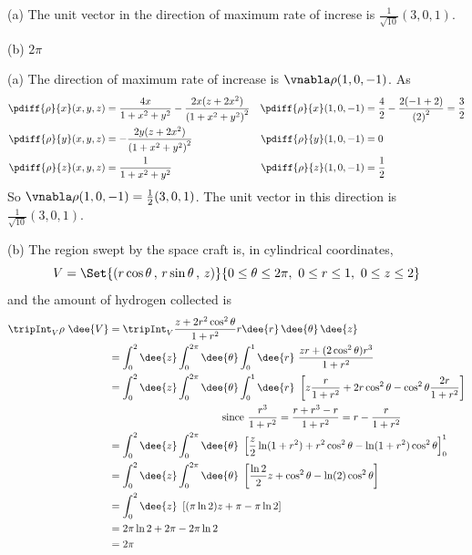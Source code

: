 \begin{answer}
(a) The unit vector in the direction of maximum rate of increse is $\frac{1}{\sqrt{10}}(3,0,1)$.

(b) $2\pi$
\end{answer}

\begin{solution}
(a) The direction of maximum rate of increase is $\vnabla\rho(1,0,-1)$.
As
\begin{align*}
\pdiff{\rho}{x}(x,y,z)
      &= \frac{4x}{1+x^2+y^2} -\frac{2x(z+2x^2)}{{(1+x^2+y^2)}^2} &
\pdiff{\rho}{x}(1,0,-1)
      &= \frac{4}{2} -\frac{2(-1+2)}{{(2)}^2} =\frac{3}{2}
\\
\pdiff{\rho}{y}(x,y,z)
      &=  -\frac{2y(z+2x^2)}{{(1+x^2+y^2)}^2} &
\pdiff{\rho}{y}(1,0,-1)
      &=  0\\
\pdiff{\rho}{z}(x,y,z)
      &= \frac{1}{1+x^2+y^2} &
\pdiff{\rho}{z}(1,0,-1)
      &= \frac{1}{2}  
\end{align*}
So $\vnabla\rho(1,0,-1) = \frac{1}{2}(3,0,1)$. The unit vector
in this direction is $\frac{1}{\sqrt{10}}(3,0,1)$.

(b) The region swept by the space craft is, in cylindrical coordinates,
\begin{equation*}
   V=\Set{(r\cos\theta\,,\,r\sin\theta\,,\,z)}{0\le\theta\le 2\pi,\ 
             0\le r\le 1,\ 
              0\le z\le 2}
\end{equation*}
and the amount of hydrogen collected is
\begin{align*}
\tripInt_V \rho\ \dee{V} &=\tripInt_V\frac{z+2r^2\cos^2\theta}{1+r^2}r\dee{r}\,\dee{\theta}\,\dee{z} \\
&=\int_0^2\dee{z} \int_0^{2\pi} \dee{\theta} \int_0^1\dee{r}\ 
              \frac{zr+(2\cos^2\theta)r^3}{1+r^2} \\
&=\int_0^2\dee{z} \int_0^{2\pi} \dee{\theta} \int_0^1\dee{r}\ 
     \left[ z \frac{r}{1+r^2} +2r\cos^2\theta 
               -\cos^2\theta\frac{2r}{1+r^2}\right]\\
&\hskip1.5in\text{since }\frac{r^3}{1+r^2} = \frac{r+r^3 - r}{1+r^2}
                         =r-\frac{r}{1+r^2} \\
&=\int_0^2\dee{z} \int_0^{2\pi} \dee{\theta}\ 
              \left[\frac{z}{2}\ln(1+r^2)+r^2\cos^2\theta
                     -\ln(1+r^2)\cos^2\theta\right]_0^1 \\
&=\int_0^2\dee{z} \int_0^{2\pi} \dee{\theta}\ 
              \left[\frac{\ln 2}{2} z+ \cos^2\theta
                     -\ln(2)\cos^2\theta\right] \\
&=\int_0^2\dee{z} \ \left[(\pi\ln 2) z+ \pi-\pi\ln 2\right] \\
&= 2\pi\ln 2 +2\pi -2\pi\ln 2 \\
&=2\pi
\end{align*}
\end{solution}


